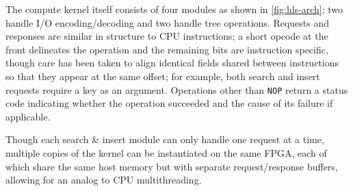 The compute kernel itself consists of four modules as shown in
\autoref{fig:hls-arch}; two handle I/O encoding/decoding and two handle tree
operations. Requests and responses are similar in structure to CPU instructions;
a short opcode at the front delineates the operation and the remaining bits are
instruction specific, though care has been taken to align identical fields
shared between instructions so that they appear at the same offset; for example,
both search and insert requests require a key as an argument. Operations other
than \texttt{NOP} return a status code indicating whether the operation
succeeded and the cause of its failure if applicable.

Though each search \& insert module can only handle one request at a time,
multiple copies of the kernel can be instantiated on the same FPGA, each of
which share the same host memory but with separate request/response buffers,
allowing for an analog to CPU multithreading.
